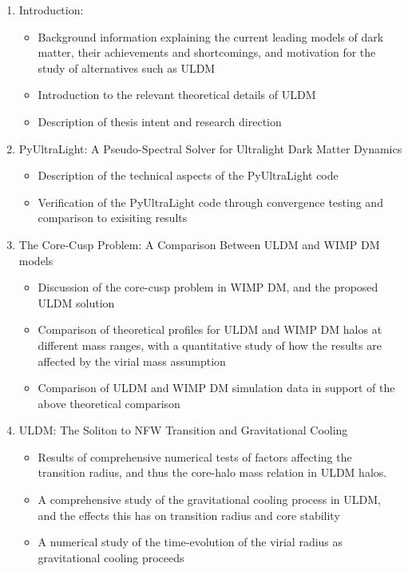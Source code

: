 \begin{enumerate}
    \item Introduction:
        \begin{itemize}
            \item Background information explaining the current leading models of dark matter, their achievements and shortcomings, and motivation for the study of alternatives such as ULDM
            \item Introduction to the relevant theoretical details of ULDM
            \item Description of thesis intent and research direction
        \end{itemize}
    \item PyUltraLight: A Pseudo-Spectral Solver for Ultralight Dark Matter Dynamics
        \begin{itemize}
            \item Description of the technical aspects of the PyUltraLight code
            \item Verification of the PyUltraLight code through convergence testing and comparison to exisiting results
        \end{itemize}
    \item The Core-Cusp Problem: A Comparison Between ULDM and WIMP DM models
        \begin{itemize}
            \item Discussion of the core-cusp problem in WIMP DM, and the proposed ULDM solution
            \item Comparison of theoretical profiles for ULDM and WIMP DM halos at different mass ranges, with a quantitative study of how the results are affected by the virial mass assumption
            \item Comparison of ULDM and WIMP DM simulation data in support of the above theoretical comparison
        \end{itemize}
    \item ULDM: The Soliton to NFW Transition and Gravitational Cooling
        \begin{itemize}
            \item Results of comprehensive numerical tests of factors affecting the transition radius, and thus the core-halo mass relation in ULDM halos.
            \item A comprehensive study of the gravitational cooling process in ULDM, and the effects this has on transition radius and core stability
            \item A numerical study of the time-evolution of the virial radius as gravitational cooling proceeds

\end{itemize}
\end{enumerate}
